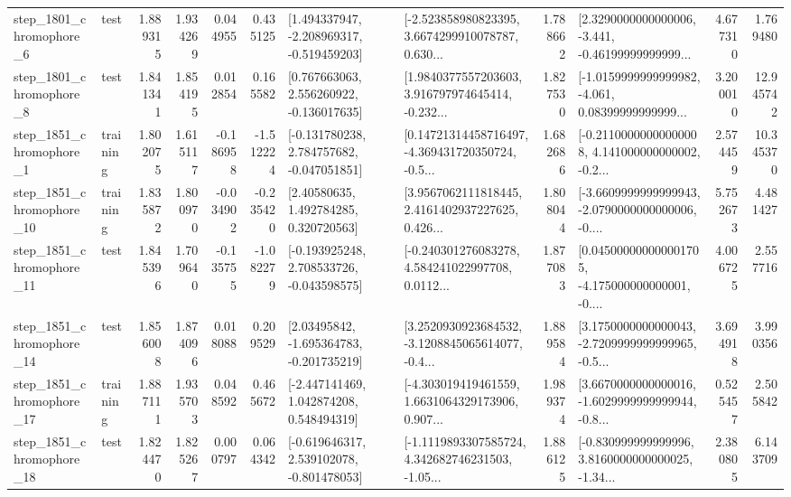 \begin{tabular}{llrrrrllrlrr}
  step\_1801\_chromophore\_6 &      test &      1.889315 &    1.934269 &      0.044955 &  0.435125 &   [1.494337947, -2.208969317, -0.519459203] &  [-2.523858980823395, 3.6674299910078787, 0.630... &       1.788662 &  [2.3290000000000006, -3.441, -0.46199999999999... &            4.677310 &          1.769480 \\
  step\_1801\_chromophore\_8 &      test &      1.841341 &    1.854195 &      0.012854 &  0.165582 &    [0.767663063, 2.556260922, -0.136017635] &  [1.9840377557203603, 3.916797974645414, -0.232... &       1.827530 &  [-1.0159999999999982, -4.061, 0.08399999999999... &            3.200010 &         12.945742 \\
  step\_1851\_chromophore\_1 &  training &      1.802075 &    1.615117 &     -0.186958 & -1.512224 &   [-0.131780238, 2.784757682, -0.047051851] &  [0.14721314458716497, -4.369431720350724, -0.5... &       1.682686 &  [-0.21100000000000008, 4.141000000000002, -0.2... &            2.574459 &         10.345370 \\
 step\_1851\_chromophore\_10 &  training &      1.835872 &    1.800970 &     -0.034902 & -0.235420 &      [2.40580635, 1.492784285, 0.320720563] &  [3.9567062111818445, 2.4161402937227625, 0.426... &       1.808044 &  [-3.6609999999999943, -2.0790000000000006, -0.... &            5.752673 &          4.481427 \\
 step\_1851\_chromophore\_11 &      test &      1.845396 &    1.709640 &     -0.135755 & -1.082279 &   [-0.193925248, 2.708533726, -0.043598575] &  [-0.240301276083278, 4.584241022997708, 0.0112... &       1.877083 &  [0.045000000000001705, -4.175000000000001, -0.... &            4.006725 &          2.557716 \\
 step\_1851\_chromophore\_14 &      test &      1.856008 &    1.874096 &      0.018088 &  0.209529 &    [2.03495842, -1.695364783, -0.201735219] &  [3.2520930923684532, -3.1208845065614077, -0.4... &       1.889584 &  [3.1750000000000043, -2.7209999999999965, -0.5... &            3.694918 &          3.990356 \\
 step\_1851\_chromophore\_17 &  training &      1.887111 &    1.935703 &      0.048592 &  0.465672 &    [-2.447141469, 1.042874208, 0.548494319] &  [-4.303019419461559, 1.6631064329173906, 0.907... &       1.989374 &  [3.6670000000000016, -1.6029999999999944, -0.8... &            0.525457 &          2.505842 \\
 step\_1851\_chromophore\_18 &      test &      1.824470 &    1.825267 &      0.000797 &  0.064342 &   [-0.619646317, 2.539102078, -0.801478053] &  [-1.1119893307585724, 4.342682746231503, -1.05... &       1.886125 &  [-0.830999999999996, 3.8160000000000025, -1.34... &            2.380805 &          6.143709 \\

\end{tabular}
